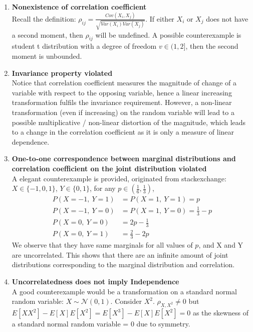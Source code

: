 \documentclass[12pt]{report}
\newcommand{\1}{\mathbf{1}}
\begin{document}
\begin{enumerate}
\item \textbf{Nonexistence of correlation coefficient} \\
\vspace{0.5cm}
Recall the definition: $\rho_{ij} = \frac{Cov(X_{i},X_{j})}{\sqrt{Var(X_{i})Var(X_{j})}}$. If either $X_{i}$ or $X_{j}$ does not have a second moment, then $\rho_{ij}$ will be undefined. A possible counterexample is student t distribution with a degree of freedom $v \in (1,2]$, then the second moment is unbounded.
\item \textbf{Invariance property violated} \\
\vspace{0.5cm}
Notice that correlation coefficient measures the magnitude of change of a variable with respect to the opposing variable, hence a linear increasing transformation fulfils the invariance requirement. However, a non-linear transformation (even if increasing) on the random variable will lead to a possible multiplicative / non-linear distortion of the magnitude, which leads to a change in the correlation coefficient as it is only a measure of linear dependence. 
\item \textbf{One-to-one correspondence between marginal distributions and correlation coefficient on the joint distribution violated}\\
\vspace{0.5cm}
A elegant counterexample is provided, originated from stackexchange: \parencite{4665041} \\
$X \in \{-1, 0, 1 \}$, $Y \in \{0, 1\}$, for any $p \in (\frac{1}{6},\frac{1}{3})$,
\begin{align*}
P(X = -1, \: Y = 1) &= P(X = 1, \: Y = 1) = p \\
P(X = -1, \: Y = 0) &= P(X = 1, \: Y = 0) = \frac{1}{3} - p \\
P(X = 0, \: Y = 0) &= 2p - \frac{1}{3} \\
P(X = 0, \: Y = 1) &= \frac{2}{3} - 2p 
\end{align*}
We observe that they have same marginals for all values of $p$, and X and Y are uncorrelated. This shows that there are an infinite amount of joint distributions corresponding to the marginal distribution and correlation.\\
    
\item \textbf{Uncorrelatedness does not imply Independence}\\
\vspace{0.5cm}
A good counterexample would be a transformation on a standard normal random variable:
$X \sim \mathcal{N}(0,1)$. Consider $X^{2}$. $\rho_{X, X^{2}} \neq 0$ but $E[XX^{2}] - E[X]E[X^{2}] = E[X^{3}] - E[X]E[X^{2}] = 0$ as the skewness of a standard normal random variable = 0 due to symmetry.


\end{enumerate}
\end{document}
